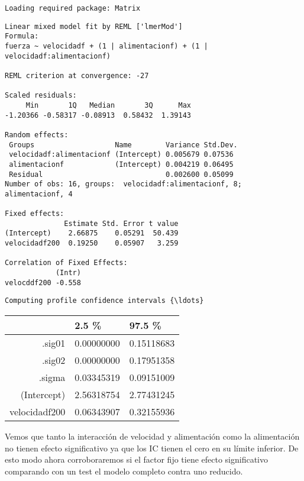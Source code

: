 \documentclass[11pt]{article}
\begin{document}
    \begin{Verbatim}[commandchars=\\\{\}]
Loading required package: Matrix

    \end{Verbatim}

    
    \begin{verbatim}
Linear mixed model fit by REML ['lmerMod']
Formula: 
fuerza ~ velocidadf + (1 | alimentacionf) + (1 | velocidadf:alimentacionf)

REML criterion at convergence: -27

Scaled residuals: 
     Min       1Q   Median       3Q      Max 
-1.20366 -0.58317 -0.08913  0.58432  1.39143 

Random effects:
 Groups                   Name        Variance Std.Dev.
 velocidadf:alimentacionf (Intercept) 0.005679 0.07536 
 alimentacionf            (Intercept) 0.004219 0.06495 
 Residual                             0.002600 0.05099 
Number of obs: 16, groups:  velocidadf:alimentacionf, 8; alimentacionf, 4

Fixed effects:
              Estimate Std. Error t value
(Intercept)    2.66875    0.05291  50.439
velocidadf200  0.19250    0.05907   3.259

Correlation of Fixed Effects:
            (Intr)
velocddf200 -0.558
    \end{verbatim}

    
    \begin{Verbatim}[commandchars=\\\{\}]
Computing profile confidence intervals {\ldots}

    \end{Verbatim}

    \begin{tabular}{r|ll}
  & 2.5 \% & 97.5 \%\\
\hline
	.sig01 & 0.00000000 & 0.15118683\\
	.sig02 & 0.00000000 & 0.17951358\\
	.sigma & 0.03345319 & 0.09151009\\
	(Intercept) & 2.56318754 & 2.77431245\\
	velocidadf200 & 0.06343907 & 0.32155936\\
\end{tabular}


    
    Vemos que tanto la interacción de velocidad y alimentación como la
alimentación no tienen efecto significativo ya que los IC tienen el cero
en su límite inferior. De esto modo ahora corroboraremos si el factor
fijo tiene efecto significativo comparando con un test el modelo
completo contra uno reducido.
\end{document}
